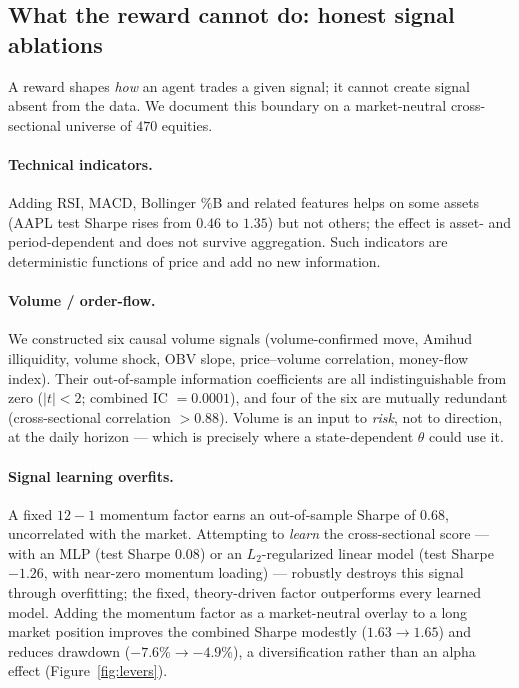 \documentclass[11pt]{article}
\theoremstyle{definition}
\begin{document}
\subsection{What the reward cannot do: honest signal ablations}\label{sec:signal}

A reward shapes \emph{how} an agent trades a given signal; it cannot create signal
absent from the data. We document this boundary on a market-neutral cross-sectional
universe of $470$ equities.

\paragraph{Technical indicators.} Adding RSI, MACD, Bollinger \%B and related features
helps on some assets (AAPL test Sharpe rises from $0.46$ to $1.35$) but not others; the
effect is asset- and period-dependent and does not survive aggregation. Such indicators
are deterministic functions of price and add no new information.

\paragraph{Volume / order-flow.} We constructed six causal volume signals
(volume-confirmed move, Amihud illiquidity, volume shock, OBV slope, price--volume
correlation, money-flow index). Their out-of-sample information coefficients are all
indistinguishable from zero ($|t|<2$; combined IC $=0.0001$), and four of the six are
mutually redundant (cross-sectional correlation $>0.88$). Volume is an input to
\emph{risk}, not to direction, at the daily horizon --- which is precisely where a
state-dependent $\theta$ could use it.

\paragraph{Signal learning overfits.} A fixed $12{-}1$ momentum factor earns an
out-of-sample Sharpe of $0.68$, uncorrelated with the market. Attempting to
\emph{learn} the cross-sectional score --- with an MLP (test Sharpe $0.08$) or an
$L_2$-regularized linear model (test Sharpe $-1.26$, with near-zero momentum loading)
--- robustly destroys this signal through overfitting; the fixed, theory-driven factor
outperforms every learned model. Adding the momentum factor as a market-neutral
overlay to a long market position improves the combined Sharpe modestly
($1.63\to1.65$) and reduces drawdown ($-7.6\%\to-4.9\%$), a diversification rather
than an alpha effect (Figure~\ref{fig:levers}).
\end{document}

